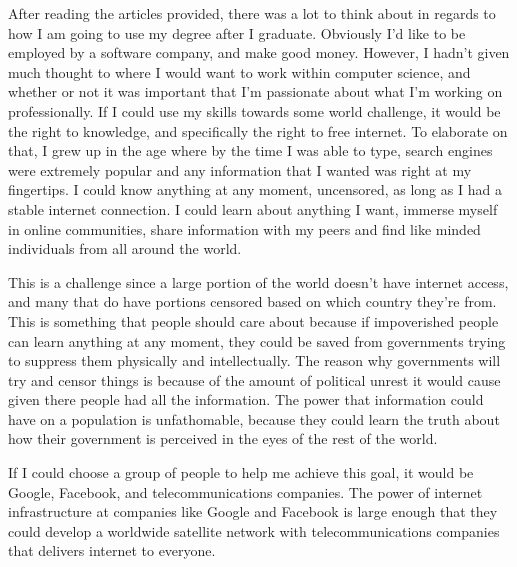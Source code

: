 \documentclass[12pt,letterpaper]{article}
\begin{document}
After reading the articles provided, there was a lot to think about in regards to how I am going to use my degree after I graduate. Obviously I’d like to be employed by a software company, and make good money. However, I hadn’t given much thought to where I would want to work within computer science, and whether or not it was important that I’m passionate about what I’m working on professionally. If I could use my skills towards some world challenge, it would be the right to knowledge, and specifically the right to free internet. To elaborate on that, I grew up in the age where by the time I was able to type, search engines were extremely popular and any information that I wanted was right at my fingertips. I could know anything at any moment, uncensored, as long as I had a stable internet connection. I could learn about anything I want, immerse myself in online communities, share information with my peers and find like minded individuals from all around the world.\par

This is a challenge since a large portion of the world doesn’t have internet access, and many that do have portions censored based on which country they're from. This is something that people should care about because if impoverished people can learn anything at any moment, they could be saved from governments trying to suppress them physically and intellectually. The reason why governments will try and censor things is because of the amount of political unrest it would cause given there people had all the information. The power that information could have on a population is unfathomable, because they could learn the truth about how their government is perceived in the eyes of the rest of the world.\par

If I could choose a group of people to help me achieve this goal, it would be Google, Facebook, and telecommunications companies. The power of internet infrastructure at companies like Google and Facebook is large enough that they could develop a worldwide satellite network with telecommunications companies that delivers internet to everyone.

\clearpage
\end{document}
